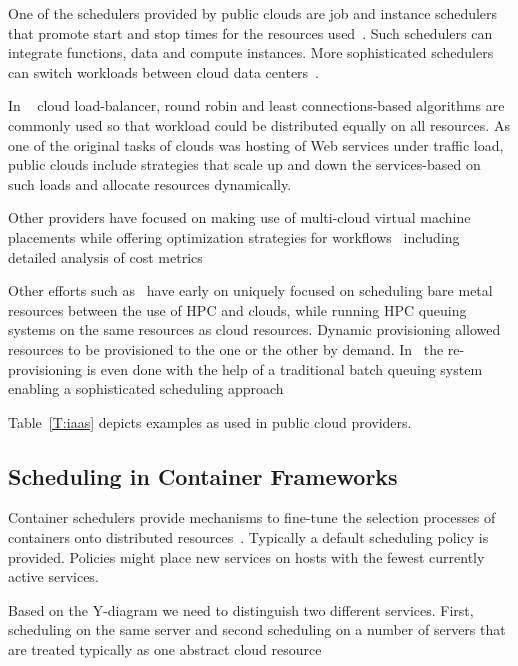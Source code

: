 \documentclass[final,5p,times,twocolumn]{elsarticle}
\begin{document}
One of the schedulers provided by public clouds are job and instance
schedulers that promote start and stop times for the resources
used~\cite{AWSIns2019,AzureSch2019,Rackspace2016,GoogleAppEngine2018}. Such
schedulers can integrate functions, data and compute instances. More
sophisticated schedulers can switch workloads between cloud data
centers~\cite{MicrosoftAzure2014}.

In ~\cite{Rackspace2016} cloud load-balancer, round robin and least
connections-based algorithms are commonly used so that workload could
be distributed equally on all resources.  As one of the original tasks
of clouds was hosting of Web services under traffic load, public
clouds include strategies that scale up and down the services-based on
such loads and allocate resources dynamically.

Other providers have focused on making use of multi-cloud virtual
machine placements while offering optimization strategies for
workflows~\cite{CloudSigma2016} including detailed analysis of cost
metrics~\cite{Cloudmetrics2019}

Other efforts such as~\cite{las12fg-bookchapter,fox2013futuregrid}
have early on uniquely focused on scheduling bare metal resources
between the use of HPC and clouds, while running HPC queuing systems
on the same resources as cloud resources. Dynamic provisioning allowed
resources to be provisioned to the one or the other by
demand. In~\cite{las-comet} the re-provisioning is even done with the
help of a traditional batch queuing system enabling a sophisticated
scheduling approach

Table~\ref{T:iaas} depicts examples as used in public cloud providers.



%


\subsection{Scheduling in Container Frameworks}
\label{sec:container}


Container schedulers provide mechanisms to fine-tune the selection
processes of containers onto distributed
resources~\cite{Containers2018,de2018distributed}. Typically a default
scheduling policy is provided. Policies might place new services on
hosts with the fewest currently active services.

Based on the Y-diagram we need to distinguish two different
services. First, scheduling on the same server and second scheduling
on a number of servers that are treated typically as one abstract
cloud resource
\end{document}

